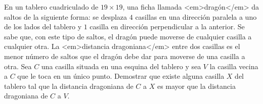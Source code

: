 En un tablero cuadriculado de $19 \times 19$, una ficha llamada <em>dragón</em> da saltos de la siguiente forma: se desplaza $4$ casillas en una dirección paralela a uno de los lados del tablero y $1$ casilla en dirección perpendicular a la anterior. \newline 
Se sabe que, con este tipo de saltos, el dragón puede moverse de cualquier casilla a cualquier otra. \newline 
La <em>distancia dragoniana</em> entre dos casillas es el menor número de saltos que el dragón debe dar para moverse de una casilla a otra. \newline 
Sea $C$ una casilla situada en una esquina del tablero y sea $V$ la casilla vecina a $C$ que le toca en un único punto. \newline 
Demostrar que existe alguna casilla $X$ del tablero tal que la distancia dragoniana de $C$ a $X$ es mayor que la distancia dragoniana de $C$ a $V$.
